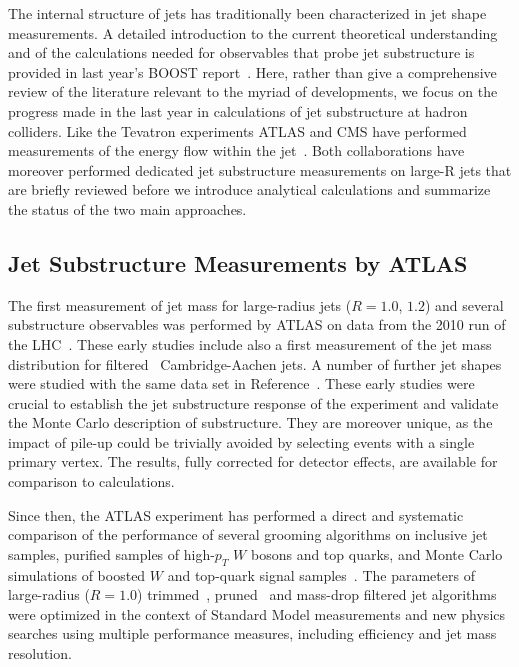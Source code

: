 
The internal structure of jets has traditionally been characterized in 
jet shape measurements. A detailed introduction to the current 
theoretical understanding and of the calculations needed for 
observables that probe jet substructure is provided in last year's BOOST 
report~\cite{Altheimer:2012mn}. Here, rather 
than give a comprehensive review of the literature relevant to the myriad of 
developments, we focus on the progress made in the last year in calculations
of jet substructure at hadron colliders. Like the Tevatron experiments 
ATLAS and CMS have performed measurements of the energy flow within the 
jet~\cite{Aad:2011kq,Chatrchyan:2012mec}. Both collaborations
have moreover performed dedicated jet substructure measurements on 
large-R jets that are briefly reviewed before we introduce 
analytical calculations and summarize the status of the two main
approaches. 

\subsection{Jet Substructure Measurements by ATLAS}
\label{subsec:jsATLAS}

The first measurement of jet mass for large-radius jets ($R=1.0$, $1.2$)
and several substructure observables was performed by ATLAS on
data from the 2010 run of the LHC~\cite{ATLAS:2012am}. These early studies
include also a first measurement of the jet mass distribution for
filtered~\cite{Butterworth:2008iy} Cambridge-Aachen jets.
A number of further jet shapes were studied with the same data set
in Reference~\cite{Aad:2012meb}. 
These early studies were crucial to establish
the jet substructure response of the experiment and validate the 
Monte Carlo description of substructure. They are moreover unique, as
the impact of pile-up could be trivially avoided by selecting 
events with a single primary vertex. The results, fully corrected for
detector effects, are available for comparison to calculations.

Since then, the ATLAS experiment has performed a direct and systematic 
comparison of the performance of several grooming algorithms on 
inclusive jet samples, purified samples of 
high-$p_{T}$ $W$ bosons and top quarks, and Monte Carlo simulations of
 boosted $W$ and top-quark signal samples~\cite{Aad:2013gja}. The parameters 
of large-radius ($R=1.0$) trimmed~\cite{Krohn:2009th}, 
pruned~\cite{Ellis:2009me} and mass-drop 
filtered jet algorithms were optimized 
in the context of Standard Model measurements and new physics searches 
using multiple performance measures, including efficiency and jet mass 
resolution. 

